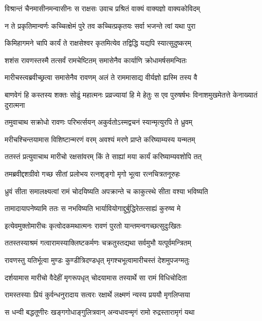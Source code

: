 \twolineshloka
{विश्रान्तं चैनमासीनमन्वासीनः स राक्षसः}
{उवाच प्रश्रितं वाक्यं वाक्यज्ञो वाक्यकोविदम्}


\twolineshloka
{न ते प्रकृतिमान्वर्णः कच्चित्क्षेमं पुरे तव}
{कच्चित्प्रकृतयः सर्वा भजन्ते त्वां यथा पुरा}


\twolineshloka
{किमिहागमने चापि कार्यं ते राक्षसेश्वर}
{कृतमित्येव तद्विद्धि यद्यपि स्यात्सुदुष्करम्}


\twolineshloka
{शशंस रावणस्तस्मै तत्सर्वं रामचेष्टितम्}
{समासेनैव कार्याणि क्रोधामर्षसमन्वितः}


\twolineshloka
{मारीचस्त्वब्रवीच्छ्रत्वा समासेनैव रावणम्}
{अलं ते राममासाद्य वीर्यज्ञो ह्यस्मि तस्य वै}


\threelineshloka
{बाणवेगं हि कस्तस्य शक्तः सोढुं महात्मनः}
{प्रव्रज्यायां हि मे हेतुः स एव पुरुषर्षभः}
{विनाशमुखमेतत्ते केनाख्यातं दुरात्मना}


\twolineshloka
{तमुवाचाथ सक्रोधो रावणः परिभर्त्सयन्}
{अकुर्वतोऽस्मद्वचनं स्यान्मृत्युरपि ते ध्रुवम्}


\twolineshloka
{मरीचश्चिन्तयामास विशिष्टान्मरणं वरम्}
{अवश्यं मरणे प्राप्ते करिष्याम्यस्य यन्मतम्}


\twolineshloka
{ततस्तं प्रत्युवाचाथ मारीचो रक्षसांवरम्}
{किं ते साह्यां मया कार्यं करिष्याम्यवशोपि तत्}


\twolineshloka
{तमब्रवीद्दशग्रीवो गच्छ सीतां प्रलोभय}
{रत्नशृङ्गो मृगो भूत्वा रत्नचित्रतनूरुहः}


\twolineshloka
{ध्रुवं सीता समालक्ष्यत्वां रामं चोदयिष्यति}
{अपक्रान्ते च काकुत्स्थे सीता वश्या भविष्यति}


\twolineshloka
{तामादायापनेष्यामि ततः स नभविष्यति}
{भार्यावियोगाद्दुर्बुद्धिरेतत्साह्यं कुरुष्व मे}


\twolineshloka
{इत्येवमुक्तोमारीचः कृत्वोदकमथात्मनः}
{रावणं पुरतो यान्तमन्वगच्छत्सुदुःखितः}


\twolineshloka
{ततस्तस्याश्रमं गत्वारामस्याक्लिष्टकर्मणः}
{चक्रतुस्तद्यथा सर्वमुभौ यत्पूर्वमन्त्रितम्}


\twolineshloka
{रावणस्तु यतिर्भूत्वा मुण्डः कुण्डीत्रिदण्डधृत्}
{मृगश्चभूत्वामारीचस्तं देशमुपजग्मतुः}


\twolineshloka
{दर्शयामास मारीचो वैदेहीं मृगरूपधृत्}
{चोदयामास तस्यार्थे सा रामं विधिचोदिता}


\twolineshloka
{रामस्तस्याः प्रियं कुर्वन्धनुरादाय सत्वरः}
{रक्षार्थे लक्ष्मणं न्यस्य प्रययौ मृगलिप्सया}


\twolineshloka
{स धन्वी बद्धतूणीरः खङ्गगोधाङ्गुलित्रवान्}
{अन्वधावन्मृगं रामो रुद्रस्तारामृगं यथा}


